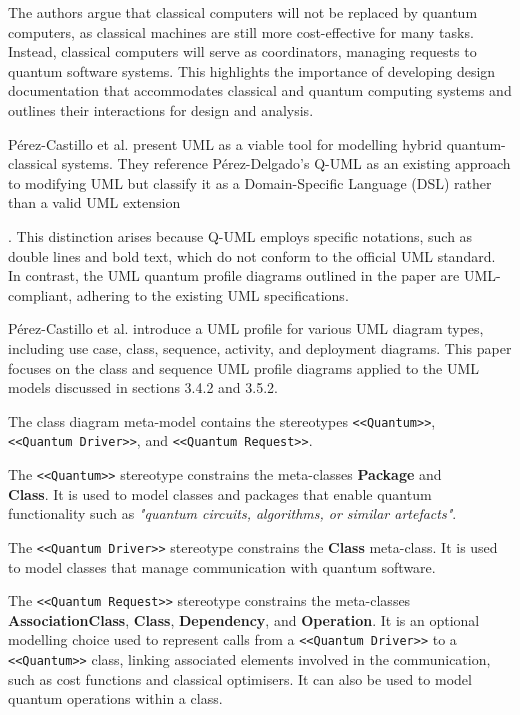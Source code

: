 \documentclass{article}
\newcounter{subsubsubsection}[subsubsection]
\begin{document}
{The authors argue that classical computers will not be replaced by quantum computers, as classical machines are still more cost-effective for many tasks. Instead, classical computers will serve as coordinators, managing requests to quantum software systems\cite{Pérez-Castillo2022}. This highlights the importance of developing design documentation that accommodates classical and quantum computing systems and outlines their interactions for design and analysis.

Pérez-Castillo et al. present UML as a viable tool for modelling hybrid quantum-classical systems. They reference Pérez-Delgado's Q-UML as an existing approach to modifying UML but classify it as a Domain-Specific Language (DSL) rather than a valid UML extension\cite{Pérez-Castillo2022}}. This distinction arises because Q-UML employs specific notations, such as double lines and bold text, which do not conform to the official UML standard. In contrast, the UML quantum profile diagrams outlined in the paper are UML-compliant, adhering to the existing UML specifications\cite{Pérez-Castillo2022}. 

Pérez-Castillo et al. introduce a UML profile for various UML diagram types, including use case, class, sequence, activity, and deployment diagrams. This paper focuses on the class and sequence UML profile diagrams applied to the UML models discussed in sections 3.4.2 and 3.5.2.


The class diagram meta-model contains the stereotypes \texttt{<<Quantum>>},\\ \texttt{<<Quantum Driver>>}, and \texttt{<<Quantum Request>>}.

The \texttt{<<Quantum>>} stereotype constrains the meta-classes \textbf{Package} and\\ \textbf{Class}. It is used to model classes and packages that enable quantum functionality such as \textit{"quantum
circuits, algorithms, or similar artefacts"}\cite{Pérez-Castillo2022}.

The \texttt{<<Quantum Driver>>} stereotype constrains the \textbf{Class} meta-class. It is used to model classes that manage communication with quantum software\cite{Pérez-Castillo2022}. 

The \texttt{<<Quantum Request>>} stereotype constrains the meta-classes \textbf{AssociationClass}, \textbf{Class}, \textbf{Dependency}, and \textbf{Operation}. It is an optional modelling choice used to represent calls from a \texttt{<<Quantum Driver>>} to a \texttt{<<Quantum>>} class, linking associated elements involved in the communication, such as cost functions and classical optimisers. It can also be used to model quantum operations within a class\cite{Pérez-Castillo2022}.
\end{document}
